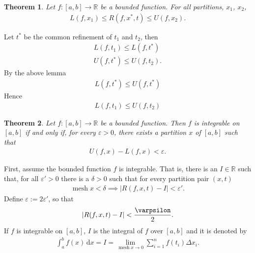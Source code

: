 \documentclass{amsart}
\numberwithin{equation}{section}
\DeclareMathOperator{\mesh}{mesh}
\let\oldendproof\endproof
\renewenvironment{proof}[1][\proofname]{%
  \setcounter{case}{0}
  \setcounter{step}{0}
  \oldproof[#1]%
}{\oldendproof}
\theoremstyle{plain}
\newtheorem{theorem}{Theorem}[section]
\newtheorem{corollary}[theorem]{Corollary}
\theoremstyle{definition}
\theoremstyle{remark}
\begin{document}
\begin{theorem}
  Let $f:[a,b] \to \mathbb{R}$ be a bounded function. 
  For all partitions, $x_1$, $x_2$,
  \begin{align*}
    L(f, x_1) \leq R(f, x^*, t) \leq U(f, x_2).
  \end{align*}
\end{theorem}
\begin{proof}
  Let $t^*$ be the common refinement of $t_1$ and $t_2$, then
  \begin{align*}
    L(f,t_1) \leq L(f,t^*)\\
    U(f,t^*) \leq U(f,t_2).
  \end{align*}
  By the above lemma
  \begin{align}
    L(f,t^*) \leq U(f,t^*)
  \end{align}
  Hence
  \begin{align}
    L(f,t_1) \leq U(f, t_2)
  \end{align}
\end{proof}


\begin{theorem}
  Let $f: [a,b] \to \mathbb{R}$ be a bounded function. Then $f$ is integrable on $[a, b]$ if and only if, for every $\varepsilon>0$, there exists a partition $x$ of $[a, b]$ such that
  \begin{align*}
    U(f,x) - L(f,x) < \varepsilon.
  \end{align*}
\end{theorem}
\begin{proof}
  First, assume the bounded function $f$ is integrable. That is, there is an $I \in \mathbb{R}$ such that, for all $\varepsilon' > 0$ there is a $\delta > 0$ such that for every partition pair $(x, t)$
  \begin{align*}
    \mesh x < \delta \implies |R(f, x, t) - I| < \varepsilon'.
  \end{align*}
  Define $\varepsilon:=2\varepsilon'$, so that
  \begin{align*}
    |R(f, x, t) - I| < \frac{\varpsilon}{2}.
  \end{align*}
  If $f$ is integrable on $[a,b]$, $I$ is the integral of $f$ over $[a,b]$ and it is denoted by
  \begin{align*}
    \int^b_a f(x) \,\mathrm{d} x = I = \lim_{\mesh x \to 0} \sum^n_{i=1} f(t_i) \Delta x_i.
  \end{align*}
\end{proof}
\end{document}
